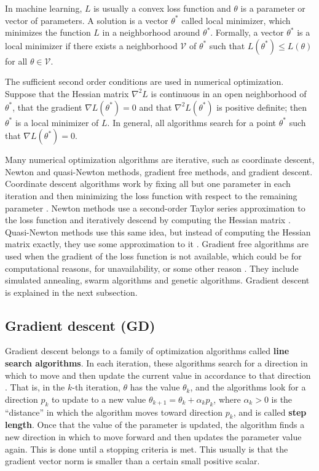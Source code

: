 In machine learning, $L$ is usually a convex loss function and $\theta$ is a parameter or vector of parameters. A solution is a vector $\theta^*$ called local minimizer, which minimizes the function $L$ in a neighborhood around $\theta^*$. Formally, a vector $\theta^*$ is a local minimizer if there exists a neighborhood $\mathcal{V}$ of $\theta^*$ such that $L(\theta^*) \leq L(\theta)$ for all $\theta \in \mathcal{V}$.

The sufficient second order conditions are used in numerical optimization. Suppose that the Hessian matrix $\nabla^2 L$ is continuous in an open neighborhood of $\theta^*$, that the gradient $\nabla L(\theta^*) = 0$ and that $\nabla^2 L(\theta^*)$ is positive definite; then $\theta^*$ is a local minimizer of $L$. In general, all algorithms search for a point $\theta^*$ such that $\nabla L(\theta^*) = 0$.

Many numerical optimization algorithms are iterative, such as coordinate descent, Newton and quasi-Newton methods, gradient free methods, and gradient descent. Coordinate descent algorithms work by fixing all but one parameter in each iteration and then minimizing the loss function with respect to the remaining parameter \cite{friedman2007pathwise} \cite{wright2015coordinate}.
Newton methods use a second-order Taylor series approximation to the loss function and iteratively descend by computing the Hessian matrix \cite[p.~22]{nocedal2006numerical}. Quasi-Newton methods use this same idea, but instead of computing the Hessian matrix exactly, they use some approximation to it \cite{byrd1995limited} \cite[p.~23]{nocedal2006numerical}.
Gradient free algorithms are used when the gradient of the loss function is not available, which could be for computational reasons, for unavailability, or some other reason \cite{rios2013derivative}. They include simulated annealing, swarm algorithms and genetic algorithms.
Gradient descent is explained in the next subsection.

\subsection{Gradient descent (GD)}

Gradient descent belongs to a family of optimization algorithms called \textbf{line search algorithms}. In each iteration, these algorithms search for a direction in which to move and then update the current value in accordance to that direction \cite[p.~19]{nocedal2006numerical}. That is, in the $k$-th iteration, $\theta$ has the value $\theta_k$, and the algorithms look for a direction $p_k$ to update to a new value $\theta_{k+1} = \theta_k + \alpha_k p_k$, where $\alpha_k > 0$ is the ``distance'' in which the algorithm moves toward direction $p_k$, and is called \textbf{step length}. Once that the value of the parameter is updated, the algorithm finds a new direction in which to move forward and then updates the parameter value again. This is done until a stopping criteria is met. This usually is that the gradient vector norm is smaller than a certain small positive scalar.

